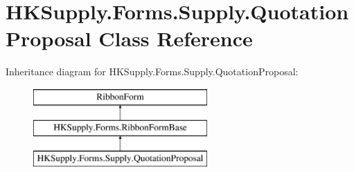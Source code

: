 \hypertarget{class_h_k_supply_1_1_forms_1_1_supply_1_1_quotation_proposal}{}\section{H\+K\+Supply.\+Forms.\+Supply.\+Quotation\+Proposal Class Reference}
\label{class_h_k_supply_1_1_forms_1_1_supply_1_1_quotation_proposal}
Inheritance diagram for H\+K\+Supply.\+Forms.\+Supply.\+Quotation\+Proposal\+:\begin{figure}[H]
\begin{center}
\leavevmode
\includegraphics[height=3.000000cm]{class_h_k_supply_1_1_forms_1_1_supply_1_1_quotation_proposal}
\end{center}
\end{figure}

